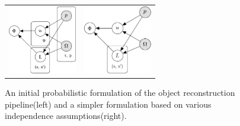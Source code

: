 \begin{figure}[!t]
	\centering
	\begin{tabular}{cc}
		\includegraphics[height=3cm]{graphical_models/pgm1.pdf}&
		\includegraphics[height=3cm]{graphical_models/pgm2.pdf}
		\vspace{-3mm}
	\end{tabular}
    \caption{An initial probabilistic formulation of the object reconstruction pipeline(left) and a simpler formulation based on various independence assumptions(right).}
	\label{fig:pgm}
\end{figure}